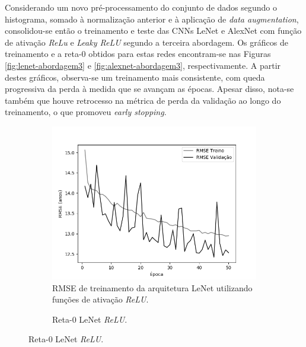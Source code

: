 	Considerando um novo pré-processamento do conjunto de dados segundo o histograma, somado à normalização anterior e à aplicação de \emph{data augmentation}, consolidou-se então o treinamento e teste das CNNs LeNet e AlexNet com função de ativação \emph{ReLu} e \emph{Leaky ReLU} segundo a terceira abordagem. Os gráficos de treinamento e a reta-0 obtidos para estas redes encontram-se nas Figuras \ref{fig:lenet-abordagem3} e \ref{fig:alexnet-abordagem3}, respectivamente. A partir destes gráficos, observa-se um treinamento mais consistente, com queda progressiva da perda à medida que se avançam as épocas. Apesar disso, nota-se também que houve retrocesso na métrica de perda da validação ao longo do treinamento, o que promoveu \emph{early stopping}.

	\begin{figure}[hb!]
		\caption{Resultados do treinamento e teste da CNN LeNet de acordo com a Abordagem 3.}\label{fig:lenet-abordagem3}
		\begin{subfigure}[hb]{0.5\linewidth}
			\caption{RMSE de treinamento da arquitetura LeNet utilizando funções de ativação \emph{ReLU}.}
			\includegraphics[width=\linewidth]{img/graficos/history/lenet/fig-history-image-treat-3-lenet-relu-rmse.png}%
		\end{subfigure}%
		\begin{subfigure}[hb]{0.5\linewidth}
			\caption{Reta-0 LeNet \emph{ReLU}.}

\end{subfigure}
\end{figure}
